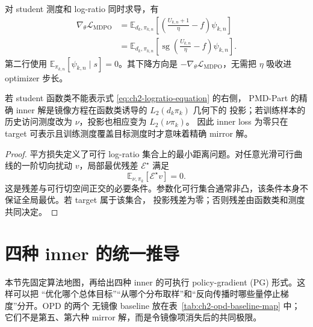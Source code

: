 对 student 测度和 log-ratio 同时求导，有
\begin{align}
\nabla_\theta\mathcal L_{\mathrm{MDPO}}
&=\mathbb E_{d_k,\pi_{k,n}}\left[\left(\frac{U_{k,n}+1}\eta-f\right)\psi_{k,n}\right]\\
&=\mathbb E_{d_k,\pi_{k,n}}\left[\operatorname{sg}\!\left(\frac{U_{k,n}}\eta-f\right)\psi_{k,n}\right].
\label{eq:ch2-mdpo-gradient-bridge}
\end{align}
第二行使用 $\mathbb E_{\pi_{k,n}}[\psi_{k,n}\mid s]=0$。其下降方向是 $-\nabla_\theta\mathcal L_{\mathrm{MDPO}}$，无需把 $\eta$ 吸收进 optimizer 步长。

\begin{proposition}[平方回归的投影含义]
\label{prop:ch2-regression-projection}
若 student 函数类不能表示式 \eqref{eq:ch2-logratio-equation} 的右侧，
PMD-Part 的精确 inner 解是镜像方程在函数类诱导的 $L_2(d_k\pi_k)$ 几何下的
投影；若训练样本的历史访问测度改为 $\nu$，投影也相应变为 $L_2(\nu\pi_k)$。
因此 inner loss 为零只在 target 可表示且训练测度覆盖目标测度时才意味着精确
mirror 解。
\end{proposition}

\begin{proof}
平方损失定义了可行 log-ratio 集合上的最小距离问题。对任意光滑可行曲线的一阶切向扰动 $v$，局部最优残差
$\mathscr E^\star$ 满足
\[
\mathbb E_{\nu,\pi_k}[\mathscr E^\star v]=0.
\]
这是残差与可行切空间正交的必要条件。参数化可行集合通常非凸，该条件本身不保证全局最优。若 target 属于该集合，
投影残差为零；否则残差由函数类和测度共同决定。
\end{proof}

\section{四种 inner 的统一推导}
\label{sec:ch2-four-methods}

本节先固定算法地图，再给出四种 inner 的可执行 policy-gradient (PG) 形式。这样可以把
“优化哪个总体目标”“从哪个分布取样”和“反向传播时哪些量停止梯度”分开。OPD 的两个
无镜像 baseline 放在表~\ref{tab:ch2-opd-baseline-map} 中；它们不是第五、第六种
mirror 解，而是令镜像项消失后的共同极限。

